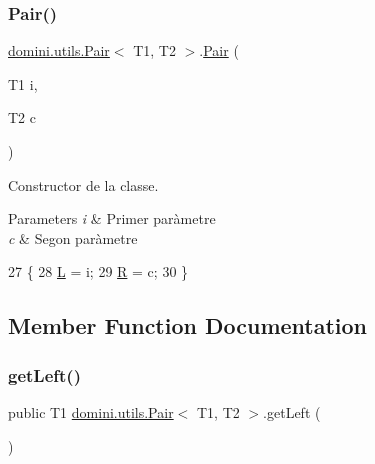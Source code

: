 \subsubsection{\texorpdfstring{Pair()}{Pair()}}
{\footnotesize\ttfamily \hyperlink{classdomini_1_1utils_1_1Pair}{domini.\+utils.\+Pair}$<$ T1, T2 $>$.\hyperlink{classdomini_1_1utils_1_1Pair}{Pair} (\begin{DoxyParamCaption}\item[{T1}]{i,  }\item[{T2}]{c }\end{DoxyParamCaption})\hspace{0.3cm}{\ttfamily [inline]}}



Constructor de la classe. 


\begin{DoxyParams}{Parameters}
{\em i} & Primer paràmetre \\
\hline
{\em c} & Segon paràmetre \\
\hline
\end{DoxyParams}

\begin{DoxyCode}
27                             \{
28         \hyperlink{classdomini_1_1utils_1_1Pair_a276a0eee9fa97fc27b37fab887f07cea}{L} = i;
29         \hyperlink{classdomini_1_1utils_1_1Pair_aebf54d48000999b84e5e24a2c62088d4}{R} = c;
30     \}
\end{DoxyCode}


\subsection{Member Function Documentation}
\mbox{\label{classdomini_1_1utils_1_1Pair_a9439fbd8488cb1fbf00c57f15f093c4b}} 
\subsubsection{\texorpdfstring{get\+Left()}{getLeft()}}
{\footnotesize\ttfamily public T1 \hyperlink{classdomini_1_1utils_1_1Pair}{domini.\+utils.\+Pair}$<$ T1, T2 $>$.get\+Left (\begin{DoxyParamCaption}{ }\end{DoxyParamCaption})\hspace{0.3cm}{\ttfamily [inline]}}

